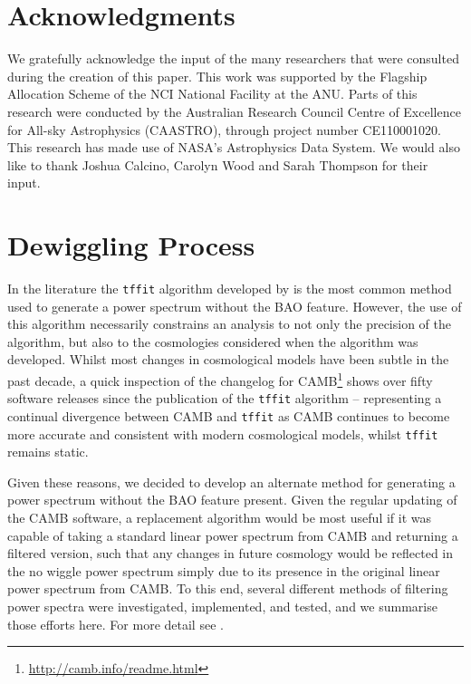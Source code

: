\documentclass[a4paper,fleqn,usenatbib]{mnras}
\begin{document}
\section*{Acknowledgments}

We gratefully acknowledge the input of the many researchers that were consulted during the creation of this paper. This work was supported by the Flagship Allocation Scheme of the NCI National Facility at the ANU. Parts of this research were conducted by the Australian Research Council Centre of Excellence for All-sky Astrophysics (CAASTRO), through project number CE110001020. This research has made use of NASA's Astrophysics Data System. We would also like to thank Joshua Calcino, Carolyn Wood and Sarah Thompson for their input. 

\clearpage





\appendix

	
	\section{Dewiggling Process} \label{app:dewiggle}
	
	In the literature the \verb;tffit; algorithm developed by \citet{EisensteinHu1998} is the most common method used to generate a power spectrum without the BAO feature. However, the use of this algorithm necessarily constrains an analysis to not only the precision of the algorithm, but also to the cosmologies considered when the algorithm was developed. Whilst most changes in cosmological models have been subtle in the past decade, a quick inspection of the changelog for CAMB\footnote{\url{http://camb.info/readme.html}} \citep{Lewis2000} shows over fifty software releases since the publication of the \verb;tffit; algorithm -- representing a continual divergence between CAMB and \verb;tffit; as CAMB continues to become more accurate and consistent with modern cosmological models, whilst \verb;tffit; remains static. 
	
	Given these reasons, we decided to develop an alternate method for generating a power spectrum without the BAO feature present. Given the regular updating of the CAMB software, a replacement algorithm would be most useful if it was capable of taking a standard linear power spectrum from CAMB and returning a filtered version, such that any changes in future cosmology would be reflected in the no wiggle power spectrum simply due to its presence in the original linear power spectrum from CAMB. To this end, several different methods of filtering power spectra were investigated, implemented, and tested, and we summarise those efforts here.  For more detail see \citet{HintonThesis2015}. 
	
\end{document}
